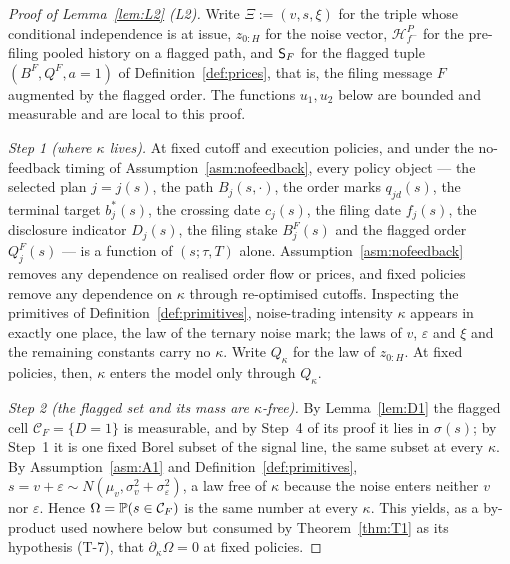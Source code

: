 \begin{proof}[Proof of Lemma~\ref{lem:L2} (L2)]
Write $\Xi := (v,s,\xi)$ for the triple whose conditional independence is at issue, $z_{0:H}$ for the
noise vector, $\mathcal H_{f^-}^P$ for the pre-filing pooled history on a flagged path, and $\mathsf{S}_F$
for the flagged tuple $(B^F,Q^F,a{=}1)$ of Definition~\ref{def:prices}, that is, the filing message
$F$ augmented by the flagged order. The functions $u_1,u_2$ below are bounded and measurable and are
local to this proof.

\emph{Step 1 (where $\kappa$ lives).} At fixed cutoff and execution policies, and under the
no-feedback timing of Assumption~\ref{asm:nofeedback}, every policy object --- the selected plan
$j = j(s)$, the path $B_j(s,\cdot)$, the order marks $q_{jd}(s)$, the terminal target $b_j^*(s)$, the
crossing date $c_j(s)$, the filing date $f_j(s)$, the disclosure indicator $D_j(s)$, the filing stake
$B_j^F(s)$ and the flagged order $Q_j^F(s)$ --- is a function of $(s;\tau,T)$ alone.
Assumption~\ref{asm:nofeedback} removes any dependence on realised order flow or prices, and fixed
policies remove any dependence on $\kappa$ through re-optimised cutoffs. Inspecting the primitives of
Definition~\ref{def:primitives}, noise-trading intensity $\kappa$ appears in exactly one place, the
law of the ternary noise mark; the laws of $v$, $\varepsilon$ and $\xi$ and the remaining constants
carry no $\kappa$. Write $Q_\kappa$ for the law of $z_{0:H}$. At fixed policies, then, $\kappa$
enters the model only through $Q_\kappa$.

\emph{Step 2 (the flagged set and its mass are $\kappa$-free).} By Lemma~\ref{lem:D1} the flagged
cell $\mathcal C_F = \{D=1\}$ is measurable, and by Step~4 of its proof it lies in $\sigma(s)$; by
Step~1 it is one fixed Borel subset of the signal line, the same subset at every $\kappa$. By
Assumption~\ref{asm:A1} and Definition~\ref{def:primitives},
$s = v+\varepsilon \sim N(\mu_v,\sigma_v^2+\sigma_\varepsilon^2)$, a law free of $\kappa$ because the
noise enters neither $v$ nor $\varepsilon$. Hence $\Omega = \mathbb{P}(s \in \mathcal C_F)$ is the same
number at every $\kappa$. This yields, as a by-product used nowhere below but consumed by
Theorem~\ref{thm:T1} as its hypothesis (T-7), that $\partial_\kappa\Omega = 0$ at fixed policies.


\end{proof}
